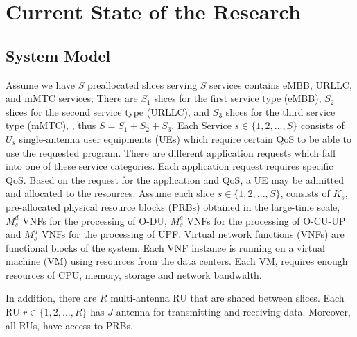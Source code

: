 \documentclass{article}
\begin{document}
\section{Current State of the Research}
\subsection{System Model}
Assume we have $S$ preallocated slices serving $S$ services contains eMBB, URLLC, and mMTC services; There are $S_1$ slices for the first service type (eMBB), $S_2$ slices for the second service type (URLLC), and $S_3$ slices for the third service type (mMTC), , thus $S=S_1+S_2+S_3$.
Each Service $s\in \{1,2,...,S\} $ consists of $U_{s}$ single-antenna user equipments (UEs) which require certain QoS to be able to use the requested program.
There are different application requests which fall into one of these service categories. Each application request requires specific QoS. Based on the request for the application and QoS, a UE may be admitted and allocated to the resources.
Assume each slice $s \in \{1,2,...,S \}$, consists of $K_{s}$, pre-allocated physical resource blocks (PRBs)  obtained in the large-time scale, $M_s^{d}$ VNFs for the processing of O-DU, $M_s^{c}$ VNFs for the processing of O-CU-UP and $M_s^{u}$ VNFs for the processing of UPF. 
Virtual network functions (VNFs) are functional blocks of the
system. Each VNF instance is running on a virtual machine (VM) using resources from the data centers. Each VM, requires enough resources of CPU, memory, storage and network bandwidth.

In addition, there are $R$ multi-antenna RU that are shared between slices. Each RU $r \in \{1,2,...,R \}$
has $J$ antenna for transmitting and receiving data. Moreover, all RUs, have access to PRBs.
\end{document}
